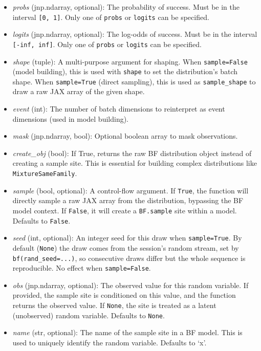\documentclass[
  letterpaper,
  DIV=11,
  numbers=noendperiod]{scrartcl}
\begin{document}
\begin{itemize}
\item
  \emph{probs} (jnp.ndarray, optional): The probability of success. Must
  be in the interval \texttt{{[}0,\ 1{]}}. Only one of \texttt{probs} or
  \texttt{logits} can be specified.
\item
  \emph{logits} (jnp.ndarray, optional): The log-odds of success. Must
  be in the interval \texttt{{[}-inf,\ inf{]}}. Only one of
  \texttt{probs} or \texttt{logits} can be specified.
\item
  \emph{shape} (tuple): A multi-purpose argument for shaping. When
  \texttt{sample=False} (model building), this is used with
  \texttt{shape} to set the distribution's batch shape. When
  \texttt{sample=True} (direct sampling), this is used as
  \texttt{sample\_shape} to draw a raw JAX array of the given shape.
\item
  \emph{event} (int): The number of batch dimensions to reinterpret as
  event dimensions (used in model building).
\item
  \emph{mask} (jnp.ndarray, bool): Optional boolean array to mask
  observations.
\item
  \emph{create\_obj} (bool): If True, returns the raw BF distribution
  object instead of creating a sample site. This is essential for
  building complex distributions like \texttt{MixtureSameFamily}.
\item
  \emph{sample} (bool, optional): A control-flow argument. If
  \texttt{True}, the function will directly sample a raw JAX array from
  the distribution, bypassing the BF model context. If \texttt{False},
  it will create a \texttt{BF.sample} site within a model. Defaults to
  \texttt{False}.
\item
  \emph{seed} (int, optional): An integer seed for this draw when
  \texttt{sample=True}. By default (\texttt{None}) the draw comes from
  the session's random stream, set by \texttt{bf(rand\_seed=...)}, so
  consecutive draws differ but the whole sequence is reproducible. No
  effect when \texttt{sample=False}.
\item
  \emph{obs} (jnp.ndarray, optional): The observed value for this random
  variable. If provided, the sample site is conditioned on this value,
  and the function returns the observed value. If \texttt{None}, the
  site is treated as a latent (unobserved) random variable. Defaults to
  \texttt{None}.
\item
  \emph{name} (str, optional): The name of the sample site in a BF
  model. This is used to uniquely identify the random variable. Defaults
  to `x'.
\end{itemize}
\end{document}
